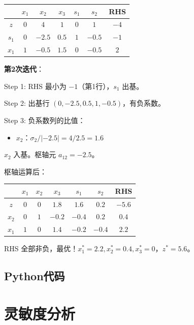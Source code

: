 \begin{example}[对偶单纯形法]
\begin{table}[H]
\centering
\begin{tabular}{@{}c|ccccc|c@{}}
\toprule
& $x_1$ & $x_2$ & $x_3$ & $s_1$ & $s_2$ & RHS \\
\midrule
$z$ & $0$ & $4$ & $1$ & $0$ & $1$ & $-4$ \\
\midrule
$s_1$ & $0$ & $-2.5$ & $0.5$ & $1$ & $-0.5$ & $-1$ \\
$x_1$ & $1$ & $-0.5$ & $1.5$ & $0$ & $-0.5$ & $2$ \\
\bottomrule
\end{tabular}
\end{table}

\textbf{第2次迭代}：

Step 1: RHS 最小为 $-1$（第1行），$s_1$ 出基。

Step 2: 出基行 $(0, -2.5, 0.5, 1, -0.5)$，有负系数。

Step 3: 负系数列的比值：
\begin{itemize}
    \item $x_2$：$\sigma_2/|{-2.5}| = 4/2.5 = 1.6$
\end{itemize}

$x_2$ 入基。枢轴元 $a_{12} = -2.5$。

枢轴运算后：

\begin{table}[H]
\centering
\begin{tabular}{@{}c|ccccc|c@{}}
\toprule
& $x_1$ & $x_2$ & $x_3$ & $s_1$ & $s_2$ & RHS \\
\midrule
$z$ & $0$ & $0$ & $1.8$ & $1.6$ & $0.2$ & $-5.6$ \\
\midrule
$x_2$ & $0$ & $1$ & $-0.2$ & $-0.4$ & $0.2$ & $0.4$ \\
$x_1$ & $1$ & $0$ & $1.4$ & $-0.2$ & $-0.4$ & $2.2$ \\
\bottomrule
\end{tabular}
\end{table}

RHS 全部非负，最优！$x_1^* = 2.2, x_2^* = 0.4, x_3^* = 0$，$z^* = 5.6$。
\end{example}

\subsection{Python代码}\label{sec:dualsimplex-code}

\section{灵敏度分析}\label{sec:sensitivity}

